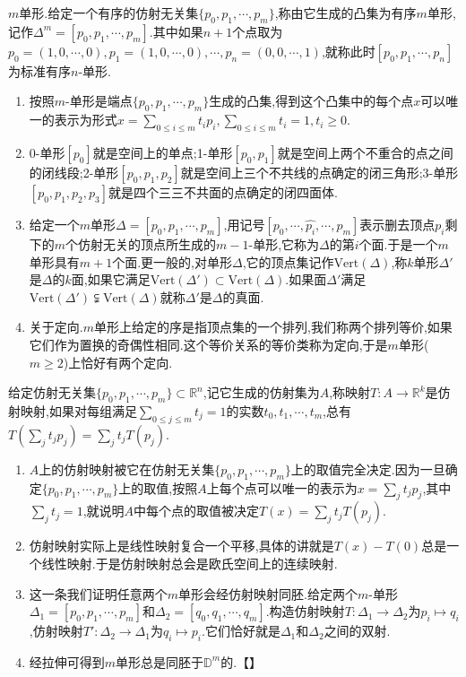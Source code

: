 $m$单形.给定一个有序的仿射无关集$\{p_0,p_1,\cdots,p_m\}$,称由它生成的凸集为有序$m$单形,记作$\Delta^m=[p_0,p_1,\cdots,p_m]$.其中如果$n+1$个点取为$p_0=(1,0,\cdots,0),p_1=(1,0,\cdots,0),\cdots,p_n=(0,0,\cdots,1)$,就称此时$[p_0,p_1,\cdots,p_n]$为标准有序$n$-单形.
\begin{enumerate}
	\item 按照$m$-单形是端点$\{p_0,p_1,\cdots,p_m\}$生成的凸集,得到这个凸集中的每个点$x$可以唯一的表示为形式$x=\sum_{0\le i\le m}t_ip_i,\sum_{0\le i\le m}t_i=1,t_i\ge0$.
	\item 0-单形$[p_0]$就是空间上的单点;1-单形$[p_0,p_1]$就是空间上两个不重合的点之间的闭线段;2-单形$[p_0,p_1,p_2]$就是空间上三个不共线的点确定的闭三角形;3-单形$[p_0,p_1,p_2,p_3]$就是四个三三不共面的点确定的闭四面体.
	\item 给定一个$m$单形$\Delta=[p_0,p_1,\cdots,p_m]$,用记号$[p_0,\cdots,\hat{p_i},\cdots,p_m]$表示删去顶点$p_i$剩下的$m$个仿射无关的顶点所生成的$m-1$-单形,它称为$\Delta$的第$i$个面.于是一个$m$单形具有$m+1$个面.更一般的,对单形$\Delta$,它的顶点集记作$\mathrm{Vert}(\Delta)$,称$k$单形$\Delta'$是$\Delta$的$k$面,如果它满足$\mathrm{Vert}(\Delta')\subset\mathrm{Vert}(\Delta)$.如果面$\Delta'$满足$\mathrm{Vert}(\Delta')\subsetneqq\mathrm{Vert}(\Delta)$就称$\Delta'$是$\Delta$的真面.
	\item 关于定向.$m$单形上给定的序是指顶点集的一个排列,我们称两个排列等价,如果它们作为置换的奇偶性相同.这个等价关系的等价类称为定向,于是$m$单形($m\ge2$)上恰好有两个定向.
\end{enumerate}

给定仿射无关集$\{p_0,p_1,\cdots,p_m\}\subset\mathbb{R}^n$,记它生成的仿射集为$A$,称映射$T:A\to\mathbb{R}^k$是仿射映射,如果对每组满足$\sum_{0\le j\le m}t_j=1$的实数$t_0,t_1,\cdots,t_m$,总有$T(\sum_jt_jp_j)=\sum_jt_jT(p_j)$.
\begin{enumerate}
	\item $A$上的仿射映射被它在仿射无关集$\{p_0,p_1,\cdots,p_m\}$上的取值完全决定.因为一旦确定$\{p_0,p_1,\cdots,p_m\}$上的取值,按照$A$上每个点可以唯一的表示为$x=\sum_jt_jp_j$,其中$\sum_jt_j=1$,就说明$A$中每个点的取值被决定$T(x)=\sum_jt_jT(p_j)$.
	\item 仿射映射实际上是线性映射复合一个平移,具体的讲就是$T(x)-T(0)$总是一个线性映射.于是仿射映射总会是欧氏空间上的连续映射.
	\item 这一条我们证明任意两个$m$单形会经仿射映射同胚.给定两个$m$-单形$\Delta_1=[p_0,p_1,\cdots,p_m]$和$\Delta_2=[q_0,q_1,\cdots,q_m]$.构造仿射映射$T:\Delta_1\to\Delta_2$为$p_i\mapsto q_i$,仿射映射$T':\Delta_2\to\Delta_1$为$q_i\mapsto p_i$.它们恰好就是$\Delta_1$和$\Delta_2$之间的双射.
	\item 经拉伸可得到$m$单形总是同胚于$\mathbb{D}^m$的.【】
\end{enumerate}

